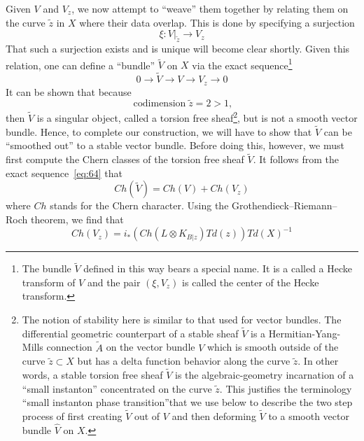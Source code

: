 \documentclass[a4paper,12pt]{article}
\numberwithin{equation}{section}
\theoremstyle{plain}
\begin{document}
Given $V$ and $V_{z}$, we now attempt to ``weave'' them
together by relating them on the curve $\tilde{z}$ in $X$ where their
data overlap. This is done by specifying a
surjection
\begin{equation}
\xi:V|_{\tilde{z}} \longrightarrow V_{z}
\label{eq:63}
\end{equation}
That such a surjection exists and is unique will become clear shortly. Given
this relation, one can define a ``bundle'' $\widetilde{V}$ on $X$ via the
exact sequence\footnote{The bundle $\widetilde{V}$ defined in this 
way bears a special name. It is a called a Hecke transform of $V$ and the pair 
$(\xi, V_{z})$ is called the center of the Hecke transform.}
\begin{equation}
0 \rightarrow \widetilde{V} \rightarrow V \rightarrow V_{z}
\rightarrow 0
\label{eq:64}
\end{equation}
It can be shown that because
\begin{equation}
\operatorname{codimension}   \tilde{z}= 2 > 1,
\label{eq:65}
\end{equation}
then $\tilde{V}$ is a singular object, 
called a torsion free sheaf\footnote{The notion of stability here is similar
to that used for vector bundles. The differential geometric counterpart of
a stable sheaf $\widetilde{V}$ is a Hermitian-Yang-Mills
connection $\widetilde{A}$ on the vector
bundle $V$ which is smooth outside of the curve $\tilde{z} \subset X$
but has a delta function behavior along the curve $\widetilde{z}$. In
other words, a stable torsion free sheaf $\widetilde{V}$ is the
algebraic-geometry incarnation of a ``small instanton''
concentrated on the curve $\widetilde{z}$. This justifies the terminology
``small instanton phase transition''that we use below to describe the
two step process of first creating $\widetilde{V}$ out of $V$ and then
deforming $\widetilde{V}$ to a smooth vector bundle $\widehat{V}$ on
$X$.}, but is not a smooth
vector bundle. Hence, to complete our construction, we will have to show that
$\widetilde{V}$ can be ``smoothed out'' to a stable vector bundle. Before
doing this, however, we must first compute the Chern classes of the
torsion free sheaf $\widetilde{V}$. It follows from the exact
sequence~\eqref{eq:64} that
\begin{equation}
Ch(\widetilde{V})=Ch(V) + Ch(V_{z})
\label{eq:66}
\end{equation}
where $Ch$ stands for the Chern character. Using the
Grothendieck--Riemann--Roch theorem, we find that
\begin{equation}
Ch(V_{z})=i_{*}(Ch(L\otimes K_{B|z})Td(z))Td(X)^{-1}
\label{eq:67}
\end{equation}
\end{document}

